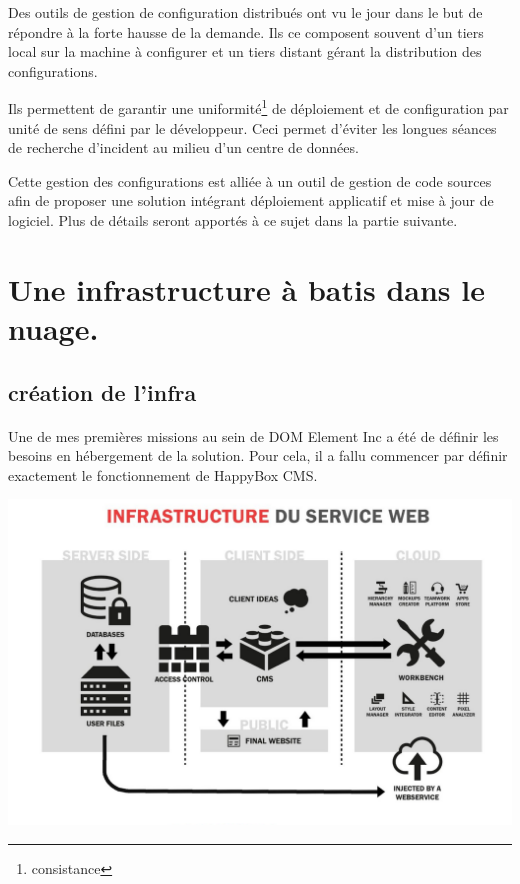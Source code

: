 \documentclass[11pt, a4paper ]{article}
\let\stdsection\section
\renewcommand\section{\newpage\stdsection}
\begin{document}
\begin{spacing}{1.5}
Des outils de gestion de configuration distribués ont vu le jour dans le but de répondre à la forte hausse de la demande. Ils ce composent souvent d'un tiers local sur la machine à configurer et un tiers distant gérant la distribution des configurations.

Ils permettent de garantir une uniformité\footnote{consistance} de déploiement et de configuration par unité de sens défini par le développeur. Ceci permet d'éviter les longues séances de recherche d'incident au milieu d'un centre de données.

Cette gestion des configurations est alliée à un outil de gestion de code sources afin de proposer une solution intégrant déploiement applicatif et mise à jour de logiciel. Plus de détails seront apportés à ce sujet dans la partie suivante.


\section{Une infrastructure à batis dans le nuage.}	 %


	\subsection{création de l'infra} %

\paragraph{}
Une de mes premières missions au sein de DOM Element Inc a été de définir les besoins en hébergement de la solution. Pour cela, il a fallu commencer par définir exactement le fonctionnement de HappyBox CMS.

\begin{center}
	\includegraphics[width=\textwidth]{images/media/fonctionnementHB.png}
\end{center}

\end{spacing}
\end{document}
